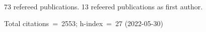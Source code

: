 73 refereed publications. 13 refeered publications as first author.

Total citations~=~2553; h-index~=~27 (2022-05-30)